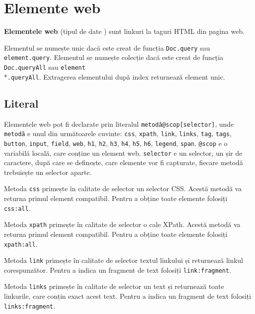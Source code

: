 \section{Elemente web}
\label{webelments}

{\bf Elementele web} (tipul de date \element) sunt linkuri la taguri HTML din pagina web.

Elementul se numește unic dacă este creat de funcția \texttt{Doc.query} sau \texttt{element.query}. Elementul se numește colecție dacă este creat de funcția \texttt{Doc.queryAll} sau \texttt{element}\\*\texttt{.queryAll}. Extragerea elementului după index returnează element unic. 

\subsection{Literal}

Elementele web pot fi declarate prin literalul \texttt{metodă@scop[selector]}, unde \texttt{metodă} e unul din următoarele cuvinte: \texttt{css}, \texttt{xpath}, \texttt{link}, \texttt{links}, \texttt{tag}, \texttt{tags}, \texttt{button}, \texttt{input}, \texttt{field}, \texttt{web}, \texttt{h1}, \texttt{h2}, \texttt{h3}, \texttt{h4}, \texttt{h5}, \texttt{h6}, \texttt{legend}, \texttt{span}. \texttt{@scop} e o variabilă locală, care conține un element web. \texttt{selector} e un selector, un șir de caractere, după care se definește, care elemente vor fi capturate, fiecare metodă trebuiește un selector aparte.

Metoda \texttt{css} primește în calitate de selector un selector CSS. Acestă metodă va returna primul element compatibil. Pentru a obține toate elemente folosiți \texttt{css:all}.

Metoda \texttt{xpath} primește în calitate de selector o cale XPath. Acestă metodă va returna primul element compatibil. Pentru a obține toate elemente folosiți \texttt{xpath:all}.

Metoda \texttt{link} primește în calitate de selector textul linkului și returnează linkul corespunzător. Pentru a indica un fragment de text folosiți \texttt{link:fragment}.

Metoda \texttt{links} primește în calitate de selector un text și returnează toate linkurile, care conțin exact acest text. Pentru a indica un fragment de text folosiți \texttt{links:fragment}.

